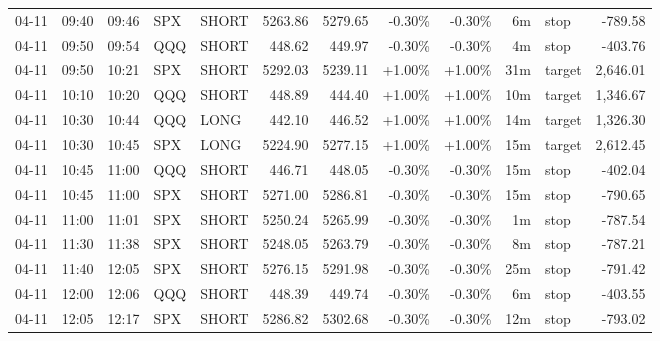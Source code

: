 \documentclass[11pt,a4paper]{article}
\begin{document}
\begin{center}
\begin{longtable}{>{\color{txtmain}}l l l l l r r r r r >{\color{txtmain}}l r}
04-11 & 09:40 & 09:46 & SPX & SHORT & 5263.86 & 5279.65 & \textcolor{lossred}{-0.30\%} & \textcolor{lossred}{-0.30\%} & 6m & stop & \textcolor{lossred}{-789.58} \\
04-11 & 09:50 & 09:54 & QQQ & SHORT & 448.62 & 449.97 & \textcolor{lossred}{-0.30\%} & \textcolor{lossred}{-0.30\%} & 4m & stop & \textcolor{lossred}{-403.76} \\
04-11 & 09:50 & 10:21 & SPX & SHORT & 5292.03 & 5239.11 & \textcolor{wingreen}{+1.00\%} & \textcolor{wingreen}{+1.00\%} & 31m & target & \textcolor{wingreen}{2,646.01} \\
04-11 & 10:10 & 10:20 & QQQ & SHORT & 448.89 & 444.40 & \textcolor{wingreen}{+1.00\%} & \textcolor{wingreen}{+1.00\%} & 10m & target & \textcolor{wingreen}{1,346.67} \\
04-11 & 10:30 & 10:44 & QQQ & LONG & 442.10 & 446.52 & \textcolor{wingreen}{+1.00\%} & \textcolor{wingreen}{+1.00\%} & 14m & target & \textcolor{wingreen}{1,326.30} \\
04-11 & 10:30 & 10:45 & SPX & LONG & 5224.90 & 5277.15 & \textcolor{wingreen}{+1.00\%} & \textcolor{wingreen}{+1.00\%} & 15m & target & \textcolor{wingreen}{2,612.45} \\
04-11 & 10:45 & 11:00 & QQQ & SHORT & 446.71 & 448.05 & \textcolor{lossred}{-0.30\%} & \textcolor{lossred}{-0.30\%} & 15m & stop & \textcolor{lossred}{-402.04} \\
04-11 & 10:45 & 11:00 & SPX & SHORT & 5271.00 & 5286.81 & \textcolor{lossred}{-0.30\%} & \textcolor{lossred}{-0.30\%} & 15m & stop & \textcolor{lossred}{-790.65} \\
04-11 & 11:00 & 11:01 & SPX & SHORT & 5250.24 & 5265.99 & \textcolor{lossred}{-0.30\%} & \textcolor{lossred}{-0.30\%} & 1m & stop & \textcolor{lossred}{-787.54} \\
04-11 & 11:30 & 11:38 & SPX & SHORT & 5248.05 & 5263.79 & \textcolor{lossred}{-0.30\%} & \textcolor{lossred}{-0.30\%} & 8m & stop & \textcolor{lossred}{-787.21} \\
04-11 & 11:40 & 12:05 & SPX & SHORT & 5276.15 & 5291.98 & \textcolor{lossred}{-0.30\%} & \textcolor{lossred}{-0.30\%} & 25m & stop & \textcolor{lossred}{-791.42} \\
04-11 & 12:00 & 12:06 & QQQ & SHORT & 448.39 & 449.74 & \textcolor{lossred}{-0.30\%} & \textcolor{lossred}{-0.30\%} & 6m & stop & \textcolor{lossred}{-403.55} \\
04-11 & 12:05 & 12:17 & SPX & SHORT & 5286.82 & 5302.68 & \textcolor{lossred}{-0.30\%} & \textcolor{lossred}{-0.30\%} & 12m & stop & \textcolor{lossred}{-793.02} \\

\end{longtable}
\end{center}
\end{document}
